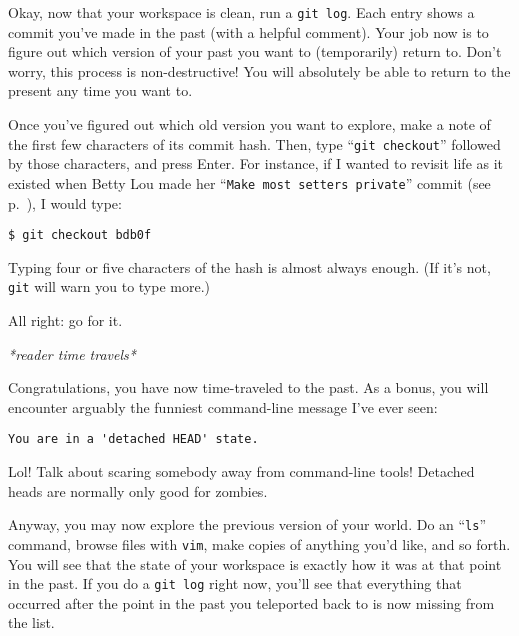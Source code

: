 Okay, now that your workspace is clean, run a \texttt{git log}. Each entry
shows a commit you've made in the past (with a helpful comment). Your job now
is to figure out which version of your past you want to (temporarily) return
to. Don't worry, this process is non-destructive! You will absolutely be able
to return to the present any time you want to.

Once you've figured out which old version you want to explore, make a note of
the first few characters of its commit hash. Then, type ``\texttt{git
checkout}'' followed by those characters, and press Enter. For instance, if I
wanted to revisit life as it existed when Betty Lou made her ``\texttt{Make
most setters private}'' commit (see p.~\pageref{gitLogOutput}), I would type:

\begin{Verbatim}[fontsize=\small,samepage=true,frame=none]
$ git checkout bdb0f
\end{Verbatim}

Typing four or five characters of the hash is almost always enough. (If it's
not, \texttt{git} will warn you to type more.)

All right: go for it.

\vspace{-.1in}
\begin{center}
\textsl{*reader time travels*}
\end{center}
\vspace{-.1in}

Congratulations, you have now time-traveled to the past. As a bonus, you will
encounter arguably the funniest command-line message I've ever seen:


\vspace{-.1in}
\begin{Verbatim}[fontsize=\small,samepage=true,frame=none]
  You are in a 'detached HEAD' state.
\end{Verbatim}
\vspace{-.1in}

Lol! Talk about scaring somebody away from command-line tools! Detached heads
are normally only good for zombies.

Anyway, you may now explore the previous version of your world. Do an
``\texttt{ls}'' command, browse files with \texttt{vim}, make copies of
anything you'd like, and so forth. You will see that the state of your
workspace is exactly how it was at that point in the past. If you do a
\texttt{git log} right now, you'll see that everything that occurred after the
point in the past you teleported back to is now missing from the list.

